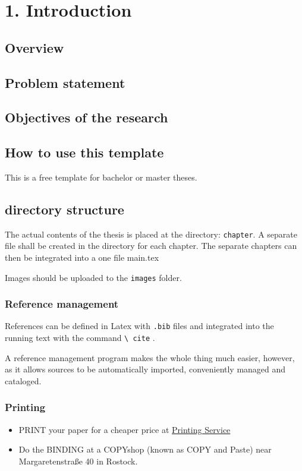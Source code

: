 \chapter{1. Introduction}

\section{Overview}
\section{Problem statement}
\section{Objectives of the research}
\section{How to use this template}
This is a free template for bachelor or master theses.\section {directory structure}

The actual contents of the thesis is placed at the directory: \texttt{chapter}. A separate file shall be created in the directory for each chapter. The separate chapters can then be integrated into a one file main.tex

Images should be uploaded to the \texttt {images} folder.


\subsection{Reference management}
References can be defined in Latex with \texttt {.bib} files and integrated into the running text with the command \texttt {\textbackslash {} cite} \cite {iuk696}. 

A reference management program makes the whole thing much easier, however, as it allows sources to be automatically imported, conveniently managed and cataloged. 

\subsection{Printing}

\begin{itemize}
    \item PRINT your paper for a cheaper price at \href{https://www.itmz.uni-rostock.de/anwendungen/multimedia/druckservice/}{Printing Service}
    \item Do the BINDING at a COPYshop (known as COPY and Paste) near Margaretenstraße 40 in Rostock.
\end{itemize}